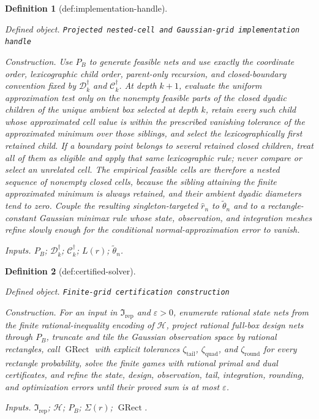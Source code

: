 \documentclass{article}
\newtheorem{definition}{Definition}
\begin{document}
\begin{definition}[def:implementation-handle]\label{def:implementation-handle}
\par\smallskip\noindent\emph{Defined object.} \texttt{Projected nested-\allowbreak{}cell and Gaussian-\allowbreak{}grid implementation handle}
\par\smallskip\noindent\emph{Construction.} Use \(P_B\) to generate feasible nets and use exactly the coordinate order, lexicographic child order, parent-only recursion, and closed-boundary convention fixed by \(\mathcal D_k^\dagger\) and \(\mathcal C_k^\dagger\). At depth \(k+1\), evaluate the uniform approximation test only on the nonempty feasible parts of the closed dyadic children of the unique ambient box selected at depth \(k\), retain every such child whose approximated cell value is within the prescribed vanishing tolerance of the approximated minimum over those siblings, and select the lexicographically first retained child. If a boundary point belongs to several retained closed children, treat all of them as eligible and apply that same lexicographic rule; never compare or select an unrelated cell. The empirical feasible cells are therefore a nested sequence of nonempty closed cells, because the sibling attaining the finite approximated minimum is always retained, and their ambient dyadic diameters tend to zero. Couple the resulting singleton-targeted \(\widehat r_n\) to \(\widetilde\theta_n\) and to a rectangle-constant Gaussian minimax rule whose state, observation, and integration meshes refine slowly enough for the conditional normal-approximation error to vanish.
\par\smallskip\noindent\emph{Inputs.} \(P_B\); \(\mathcal D_k^\dagger\); \(\mathcal C_k^\dagger\); \(L(r)\); \(\widetilde\theta_n\).
\end{definition}

\begin{definition}[def:certified-solver]\label{def:certified-solver}
\par\smallskip\noindent\emph{Defined object.} \texttt{Finite-\allowbreak{}grid certification construction}
\par\smallskip\noindent\emph{Construction.} For an input in \(\mathfrak I_{\mathrm{rep}}\) and \(\varepsilon>0\), enumerate rational state nets from the finite rational-inequality encoding of \(\mathcal H\), project rational full-box design nets through \(P_B\), truncate and tile the Gaussian observation space by rational rectangles, call \(\operatorname{GRect}\) with explicit tolerances \(\zeta_{\mathrm{tail}}\), \(\zeta_{\mathrm{quad}}\), and \(\zeta_{\mathrm{round}}\) for every rectangle probability, solve the finite games with rational primal and dual certificates, and refine the state, design, observation, tail, integration, rounding, and optimization errors until their proved sum is at most \(\varepsilon\).
\par\smallskip\noindent\emph{Inputs.} \(\mathfrak I_{\mathrm{rep}}\); \(\mathcal H\); \(P_B\); \(\Sigma(r)\); \(\operatorname{GRect}\).
\end{definition}
\end{document}
